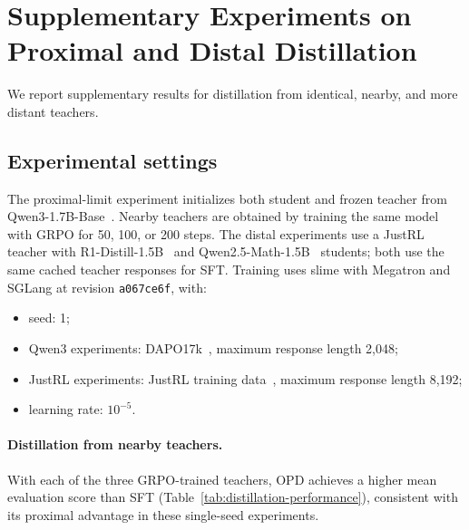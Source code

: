\section{Supplementary Experiments on Proximal and Distal Distillation}
\label{app:distillation-experiments}

We report supplementary results for distillation from identical, nearby,
and more distant teachers.

\subsection{Experimental settings}

The proximal-limit experiment initializes both student and frozen teacher
from Qwen3-1.7B-Base~\citep{yang_qwen3_2025}. Nearby teachers are obtained by training the same
model with GRPO for 50, 100, or 200 steps. The distal experiments use a
JustRL teacher with R1-Distill-1.5B~\citep{deepseek-ai_deepseek-r1_2025} and Qwen2.5-Math-1.5B~\citep{qwen_qwen25_2025} students;
both use the same cached teacher responses for SFT. Training uses slime
with Megatron and SGLang at revision \texttt{a067ce6f}, with:
\begin{itemize}
  \item seed: 1;
  \item Qwen3 experiments: DAPO17k~\citep{yu_dapo_2025}, maximum response length 2,048;
  \item JustRL experiments: JustRL training data~\citep{he_justrl_2025}, maximum response length 8,192;
  \item learning rate: $10^{-5}$.
\end{itemize}

\paragraph{Distillation from nearby teachers.} With each of the three GRPO-trained teachers, OPD achieves a higher mean
evaluation score than SFT (Table~\ref{tab:distillation-performance}),
consistent with its proximal advantage in these single-seed experiments.
%

